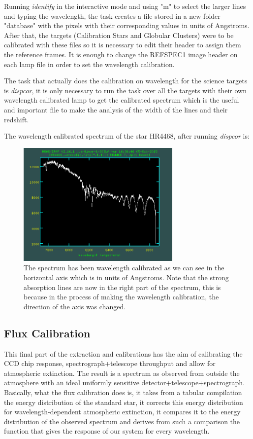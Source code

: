 Running \textit{identify} in the interactive mode and using "m" to select the larger lines and typing the wavelength, the task creates a file stored in a new folder "database" with the pixels with their corresponding values in units of Angstroms. After that, the targets (Calibration Stars and Globular Clusters) were to be calibrated with these files so it is necessary to edit their header to assign them the reference frames. It is enough to change the REFSPEC1 image header on each lamp file in order to set the wavelength calibration. 

The task that actually does the calibration on wavelength for the science targets is \textit{dispcor}, it is only necessary to run the task over all the targets with their own wavelength calibrated lamp to get the calibrated spectrum which is the useful and important file to make the analysis of the width of the lines and their redshift.

The wavelength calibrated spectrum of the star HR4468, after running \textit{dispcor} is:

\begin{figure}[H]
\centering
\includegraphics[width=8cm]{images/calib_star_wave.png}
\caption[Wavelength calibrated spectrum of HR4468]{The spectrum has been wavelength calibrated as we can see in the horizontal axis which is in units of Angstroms. Note that the strong absorption lines are now in the right part of the spectrum, this is because in the process of making the wavelength calibration, the direction of the axis was changed.}
\end{figure}

\subsection{Flux Calibration}

This final part of the extraction and calibrations has the aim of calibrating the CCD chip response, spectrograph+telescope throughput and allow for atmospheric extinction. The result is a spectrum as observed from outside the atmosphere with an ideal uniformly sensitive detector+telescope+spectrograph. Basically, what the flux calibration does is, it takes from a tabular compilation the energy distribution of the standard star, it corrects this energy distribution for wavelength-dependent atmospheric extinction, it compares it to the energy distribution of the observed spectrum and derives from such a comparison the function that gives the response of our system for every wavelength.

